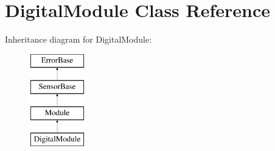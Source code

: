 \hypertarget{classDigitalModule}{\section{\-Digital\-Module \-Class \-Reference}
\label{classDigitalModule}
}
\-Inheritance diagram for \-Digital\-Module\-:\begin{figure}[H]
\begin{center}
\leavevmode
\includegraphics[height=4.000000cm]{classDigitalModule}
\end{center}
\end{figure}
